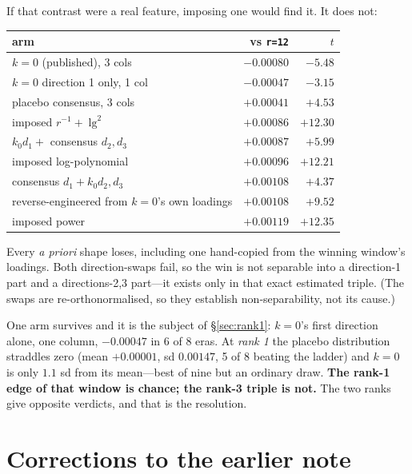 \documentclass[11pt,a4paper]{article}
\begin{document}
If that contrast were a real feature, imposing one would find it. It does not:

\begin{table}[h]
\centering
\begin{tabular}{lrr}
\toprule
arm & vs \texttt{r=12} & $t$ \\
\midrule
$k{=}0$ (published), 3 cols     & $-0.00080$ & $-5.48$ \\
$k{=}0$ direction 1 only, 1 col & $-0.00047$ & $-3.15$ \\
placebo consensus, 3 cols       & $+0.00041$ & $+4.53$ \\
imposed $r^{-1}+\lg^2$          & $+0.00086$ & $+12.30$ \\
$k_0 d_1 + $ consensus $d_2,d_3$ & $+0.00087$ & $+5.99$ \\
imposed log-polynomial          & $+0.00096$ & $+12.21$ \\
consensus $d_1 + k_0 d_2,d_3$   & $+0.00108$ & $+4.37$ \\
reverse-engineered from $k{=}0$'s own loadings & $+0.00108$ & $+9.52$ \\
imposed power                   & $+0.00119$ & $+12.35$ \\
\bottomrule
\end{tabular}
\end{table}

\noindent
Every \emph{a priori} shape loses, including one hand-copied from the winning
window's loadings. Both direction-swaps fail, so the win is not separable into
a direction-1 part and a directions-2,3 part---it exists only in that exact
estimated triple. (The swaps are re-orthonormalised, so they establish
non-separability, not its cause.)

One arm survives and it is the subject of \S\ref{sec:rank1}: $k{=}0$'s first
direction alone, one column, $-0.00047$ in 6 of 8 eras. At \emph{rank 1} the
placebo distribution straddles zero (mean $+0.00001$, sd $0.00147$, 5 of 8
beating the ladder) and $k{=}0$ is only $1.1$ sd from its mean---best of nine
but an ordinary draw. \textbf{The rank-1 edge of that window is chance; the
rank-3 triple is not.} The two ranks give opposite verdicts, and that is the
resolution.

\section{Corrections to the earlier note}
\label{sec:corrections}
\end{document}
